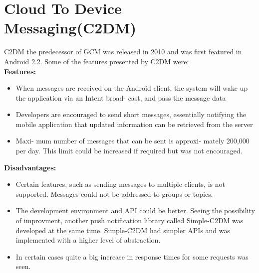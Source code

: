 \section{Cloud To Device Messaging(C2DM)}
C2DM the predecessor of GCM was released in 2010 and was first featured in Android 2.2. Some of the features presented by C2DM were:\\
\textbf{Features:}
      \begin{itemize}
      		\item When messages are received on the Android client, the
system will wake up the application via an Intent broad-
cast, and pass the message data
		\item Developers are encouraged to
send short messages, essentially notifying the mobile
application that updated information can be retrieved
from the server
		\item Maxi-
mum number of messages that can be sent is approxi-
mately 200,000 per day. This limit could be increased if required but was not encouraged.
	\end{itemize}
\textbf{Disadvantages:} 
      	\begin{itemize}
      		\item Certain features, such as sending messages to
multiple clients, is not supported. Messages could not be addressed to groups or topics.
		\item The development environment and API could be better. Seeing the possibility of improvment, another push notification library called Simple-C2DM was developed at the same time. Simple-C2DM had simpler APIs and was implemented with a higher level of abstraction.
		\item In certain cases
quite a big increase in response times for some requests was seen.
	\end{itemize}

